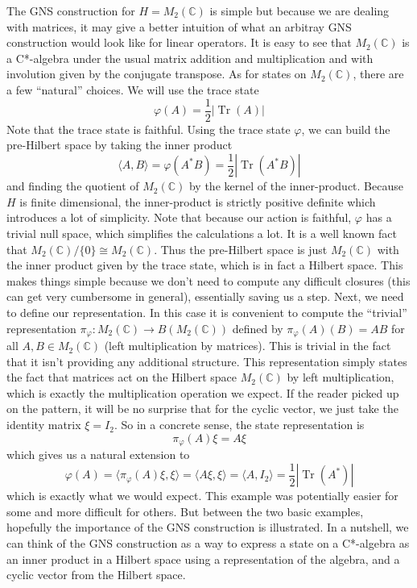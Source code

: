 \begin{example}
The GNS construction for \(  H = M_2(\mathbb{C}) \) is simple but because we are
dealing with matrices, it may give a better intuition of what an arbitray GNS construction
would look like for linear operators. It is easy to see that $M_2(\mathbb{C})$ is a
C*-algebra under the usual matrix addition and multiplication and with involution
given by the conjugate transpose. As for states on $M_2(\mathbb{C})$, there are
a few ``natural'' choices. We will use the trace state
\begin{equation}
    \varphi(A) = \frac{1}{2} | \operatorname{Tr}(A) |
\end{equation}
Note that the trace state is faithful. Using the trace state $\varphi$, we can
build the pre-Hilbert space by taking the inner product
\begin{equation}
    \langle A,B \rangle = \varphi(A^*B) = \frac{1}{2} | \operatorname{Tr}(A^*B) |
\end{equation}
and finding the quotient of $M_2(\mathbb{C})$ by the kernel of the inner-product.
Because $H$ is finite dimensional, the inner-product is strictly positive definite
which introduces a lot of simplicity. Note that because our action is faithful,
$\varphi$ has a trivial null space, which simplifies the calculations a lot. It
is a well known fact that $M_2(\mathbb{C})/\{0\} \cong M_2(\mathbb{C})$.
Thus the pre-Hilbert space is just $M_2(\mathbb{C})$ with the inner product given
by the trace state, which is in fact a Hilbert space. This makes things simple because
we don't need to compute any difficult closures (this can get very cumbersome in general),
essentially saving us a step. Next, we need to define our representation. In this case
it is convenient to compute the ``trivial'' representation
$\pi_\varphi: M_2(\mathbb{C}) \to B(M_2(\mathbb{C}))$
defined by $\pi_\varphi(A)(B) = AB$ for all $A,B \in M_2(\mathbb{C})$
(left multiplication by matrices). This is trivial in the fact that it isn't providing
any additional structure. This representation simply states the fact that matrices act on the Hilbert space
$M_2(\mathbb{C})$ by left multiplication, which is exactly the multiplication operation
we expect. If the reader picked up on the pattern, it will be no surprise that for the
cyclic vector, we just take the identity matrix $\xi = I_2$. So in a concrete sense,
the state representation is
\begin{equation}
    \pi_\varphi (A) \xi = A \xi
\end{equation}
which gives us a natural extension to
\begin{equation}
    \varphi(A) = \langle \pi_\varphi(A )\xi, \xi \rangle = \langle A\xi , \xi \rangle
    = \langle A, I_2 \rangle = \frac{1}{2}|\operatorname{Tr}(A^*)|
\end{equation}
which is exactly what we would expect. This example was potentially easier for some
and more difficult for others. But between the two basic examples, hopefully the 
importance of the GNS construction is illustrated. In a nutshell, we can think of 
the GNS construction as a way to express a state on a C*-algebra as an inner
product in a Hilbert space using a representation of the algebra, and a cyclic
vector from the Hilbert space.


\end{example}